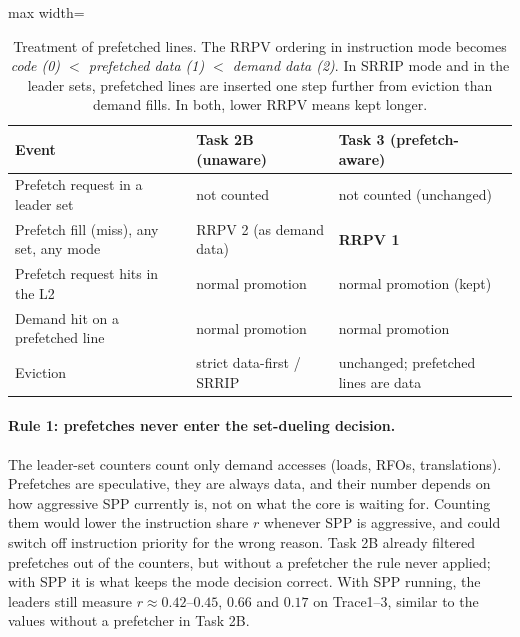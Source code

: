 \documentclass[11pt]{article}
\begin{document}
\begin{table}[H]
\centering
\small
\begin{adjustbox}{max width=\textwidth}
\begin{tabular}{lll}
\toprule
Event & Task 2B (unaware) & Task 3 (prefetch-aware) \\
\midrule
Prefetch request in a leader set & not counted & not counted (unchanged) \\
Prefetch fill (miss), any set, any mode & RRPV 2 (as demand data) & \textbf{RRPV 1} \\
Prefetch request hits in the L2 & normal promotion & normal promotion (kept) \\
Demand hit on a prefetched line & normal promotion & normal promotion \\
Eviction & strict data-first / SRRIP & unchanged; prefetched lines are data \\
\bottomrule
\end{tabular}
\end{adjustbox}
\caption{Treatment of prefetched lines. The RRPV ordering in instruction mode becomes
\emph{code (0) $<$ prefetched data (1) $<$ demand data (2)}. In SRRIP mode and in the leader
sets, prefetched lines are inserted one step further from eviction than demand fills. In both, lower RRPV means
kept longer.}
\label{tab:design}
\end{table}

\paragraph{Rule 1: prefetches never enter the set-dueling decision.} The leader-set counters
count only demand accesses (loads, RFOs, translations). Prefetches are speculative, they are
always data, and their number depends on how aggressive SPP currently is, not on what the core is
waiting for. Counting them would lower the instruction share $r$ whenever SPP is aggressive, and
could switch off instruction priority for the wrong reason. Task 2B already filtered prefetches
out of the counters, but without a prefetcher the rule never applied; with SPP it is what keeps
the mode decision correct. With SPP running, the leaders still measure $r \approx 0.42$--$0.45$,
$0.66$ and $0.17$ on Trace1--3, similar to the values without a prefetcher in Task 2B.
\end{document}
